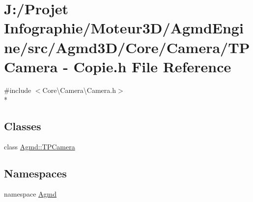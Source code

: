 \hypertarget{_t_p_camera_01-_01_copie_8h}{\section{J\-:/\-Projet Infographie/\-Moteur3\-D/\-Agmd\-Engine/src/\-Agmd3\-D/\-Core/\-Camera/\-T\-P\-Camera -\/ Copie.\-h File Reference}
\label{_t_p_camera_01-_01_copie_8h}
}
{\ttfamily \#include $<$Core\textbackslash{}\-Camera\textbackslash{}\-Camera.\-h$>$}\\*
\subsection*{Classes}
\begin{DoxyCompactItemize}
\item 
class \hyperlink{class_agmd_1_1_t_p_camera}{Agmd\-::\-T\-P\-Camera}
\end{DoxyCompactItemize}
\subsection*{Namespaces}
\begin{DoxyCompactItemize}
\item 
namespace \hyperlink{namespace_agmd}{Agmd}
\end{DoxyCompactItemize}
